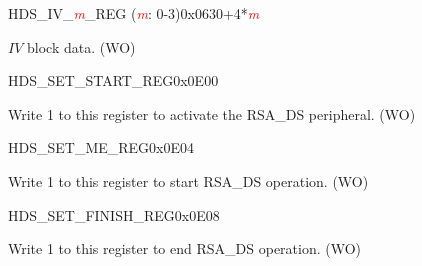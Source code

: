 


\begin{register}{H}{DS\_IV\_\textcolor{red}{\it{m}}\_REG (\textcolor{red}{\it{m}}: 0-3)}{0x0630+4*\textcolor{red}{\it{m}}}\label{regdesc:DSIVREG}
%
\regnewline%
\begin{regdesc}\begin{reglist}
\item [DS\_IV\_\textcolor{red}{\it{m}}\_REG (\textcolor{red}{\it{m}}: 0-3)] \begin{math}IV\end{math} block data. (WO)
\end{reglist}\end{regdesc}
\end{register}


\begin{register}{H}{DS\_SET\_START\_REG}{0x0E00}\label{regdesc:DSSETSTARTREG}
%
%
\regnewline%
\begin{regdesc}\begin{reglist}
\item [DS\_SET\_START] Write 1 to this register to activate the RSA\_DS peripheral. (WO)
\end{reglist}\end{regdesc}
\end{register}


\begin{register}{H}{DS\_SET\_ME\_REG}{0x0E04}\label{regdesc:DSSETMEREG}
%
%
\regnewline%
\begin{regdesc}\begin{reglist}
\item [DS\_SET\_ME] Write 1 to this register to start RSA\_DS operation. (WO)
\end{reglist}\end{regdesc}
\end{register}


\begin{register}{H}{DS\_SET\_FINISH\_REG}{0x0E08}\label{regdesc:DSSETFINISHREG}
%
%
\regnewline%
\begin{regdesc}\begin{reglist}
\item [DS\_SET\_FINISH] Write 1 to this register to end RSA\_DS operation. (WO)
\end{reglist}\end{regdesc}
\end{register}



